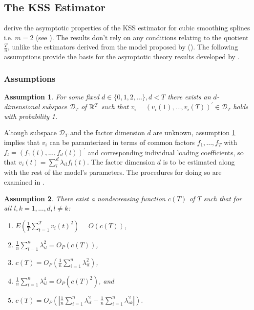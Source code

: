 \subsection{The \acs{KSS} Estimator}

\citet{kneip2012new} derive the asymptotic properties of the \ac{KSS} estimator for cubic smoothing splines i.e. $m = 2$ (see ). The results don't rely on any conditions relating to the quotient $\frac{T}{n}$, unlike the estimators derived from the model proposed by \citet{bai2009panel} (). The following assumptions provide the basis for the asymptotic theory results developed by \citet{kneip2012new}.

\subsubsection{Assumptions}


\newtheorem{assumption}{Assumption}

\begin{assumption}\label{kss_asumption_1}
    For some fixed $d \in \{0,1,2,  \ldots\}, d < T$ there exists an $d$-dimensional subspace $\mathcal{D}_T$ of $\mathbb{R}^T$ such that $v_i = (v_i(1), \ldots, v_i(T))^\prime \in \mathcal{D}_T$ holds with probability 1. 
\end{assumption}

Altough subspace $\mathcal{D}_T$ and the factor dimension $d$ are unknown, assumption \ref{kss_asumption_1} implies that $v_i$ can be paramterized in terms of common factors $f_1, ..., f_T$ with $f_t = (f_1(t), \ldots, f_d(t))^\prime$ and corresponding individual loading coefficients, so that $v_i(t)  = \sum_l^d \lambda_{il} f_l(t)$. The factor dimension $d$ is to be estimated along with the rest of the model's parameters. The procedures for doing so are examined in . 




\begin{assumption}\label{assumption_kss2}
    There exist a nondecreasing function $c(T)$ of $T$ such that for all $l,k = 1, \ldots, d, l \neq k$:
        \begin{enumerate}[label = (\roman*)]
            \item $E( \frac{1}{T} \sum_{t=1}^T v_i(t)^2) = O(c(T))$, \label{part1}
            \item $\frac{1}{n} \sum_{i=1}^n \lambda_{il}^2 = O_P(c(T))$, \label{part2}
            \item $c(T) = O_P (\frac{1}{n} \sum_{i=1}^n  \lambda_{il}^2)$, \label{part3}
            \item $\frac{1}{n} \sum_{i=1}^n \lambda_{il}^4 = O_P(c(T)^2)$, and \label{part4}
            \item $c(T) = O_P( |\frac{1}{n}\sum_{i=1}^n \lambda_{il}^2 - \frac{1}{n}\sum_{i=1}^n \lambda_{ik}^2|) $. \label{part5}
            
        \end{enumerate}
    \end{assumption}

